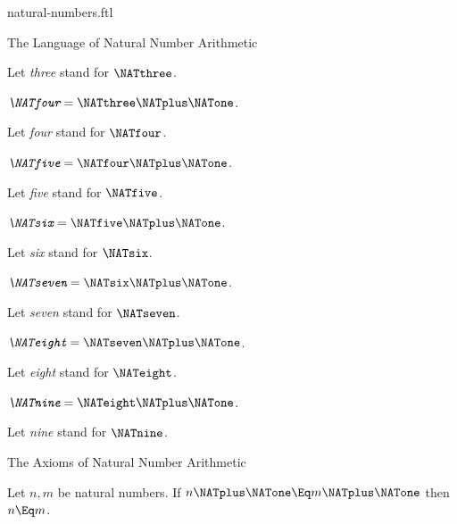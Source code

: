 \documentclass{stex}
\begin{document}
\begin{smodule}{natural-numbers.ftl}
\begin{sfragment}{The Language of Natural Number Arithmetic}
\begin{definition}[forthel,id=ARITHMETIC_01_3836725109456896]
    Let \emph{three} stand for $\NATthree$.
  \end{definition}

  \begin{definition}[forthel,id=ARITHMETIC_01_1709884968009728]
    $\emph{\NATfour} = \NATthree \NATplus \NATone$.

    Let \emph{four} stand for $\NATfour$.
  \end{definition}

  \begin{definition}[forthel,id=ARITHMETIC_01_6734726333202432]
    $\emph{\NATfive} = \NATfour \NATplus \NATone$.

    Let \emph{five} stand for $\NATfive$.
  \end{definition}

  \begin{definition}[forthel,id=ARITHMETIC_01_949139189792768]
    $\emph{\NATsix} = \NATfive \NATplus \NATone$.

    Let \emph{six} stand for $\NATsix$.
  \end{definition}

  \begin{definition}[forthel,id=ARITHMETIC_01_7245471749767168]
    $\emph{\NATseven} = \NATsix \NATplus \NATone$.

    Let \emph{seven} stand for $\NATseven$.
  \end{definition}

  \begin{definition}[forthel,id=ARITHMETIC_01_5658172888973312]
    $\emph{\NATeight} = \NATseven \NATplus \NATone$.

    Let \emph{eight} stand for $\NATeight$.
  \end{definition}

  \begin{definition}[forthel,id=ARITHMETIC_01_7371844250238976]
    $\emph{\NATnine} = \NATeight \NATplus \NATone$.

    Let \emph{nine} stand for $\NATnine$.
  \end{definition}
\end{sfragment}

\begin{sfragment}{The Axioms of Natural Number Arithmetic}
  \begin{axiom}[forthel,id=ARITHMETIC_01_3604163883696128]
    Let $n, m$ be natural numbers.
    If $n \NATplus \NATone \Eq m \NATplus \NATone$ then $n \Eq m$.
  \end{axiom}


\end{sfragment}
\end{smodule}
\end{document}
